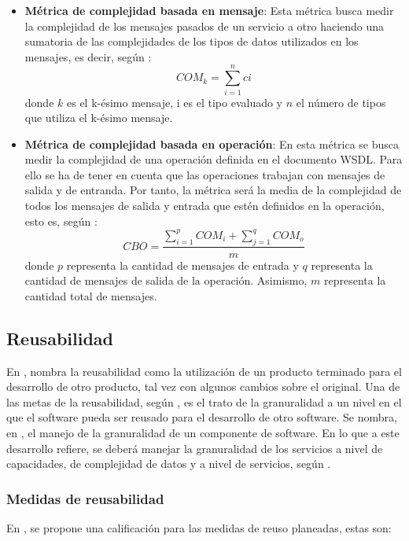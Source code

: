 \begin{itemize}

 \item \textbf{Métrica de complejidad basada en mensaje}: Esta métrica busca medir la complejidad de los mensajes pasados de un servicio a otro haciendo una sumatoria de las complejidades de los tipos de datos utilizados en los mensajes, es decir, según \cite{complexity_mesure}: $$COM_{k} = \sum_{i=1}^{n} ci$$ donde $k$ es el k-ésimo mensaje, i es el tipo evaluado y $n$ el número de tipos que utiliza el k-ésimo mensaje.
 \item \textbf{Métrica de complejidad basada en operación}: En esta métrica se busca medir la complejidad de una operación definida en el documento WSDL. Para ello se ha de tener en cuenta que las operaciones trabajan con mensajes de salida y de entranda. Por tanto, la métrica será la media de la complejidad de todos los mensajes de salida y entrada que estén definidos en la operación, esto es, según \cite{complexity_mesure}: $$CBO = \frac{\sum_{i=1}^{p} COM_{i} + \sum_{j=1}^{q} COM_{o}}{m}$$ donde $p$ representa la cantidad de mensajes de entrada y $q$ representa la cantidad de mensajes de salida de la operación. Asimismo, $m$ representa la cantidad total de mensajes.

\end{itemize}

\subsection{Reusabilidad}

En \cite{computer_science}, nombra la reusabilidad como la utilización de un producto terminado para el desarrollo de otro producto, tal vez con algunos cambios sobre el original. Una de las metas de la reusabilidad, según \cite{computer_science}, es el trato de la granuralidad a un nivel en el que el software pueda ser reusado para el desarrollo de otro software. Se nombra, en \cite{computer_science}, el manejo de la granuralidad de un componente de software. En lo que a este desarrollo refiere, se deberá manejar la granuralidad de los servicios a nivel de capacidades, de complejidad de datos y a nivel de servicios, según \cite{soa_principles}.

\subsubsection{Medidas de reusabilidad}

 En \cite{soa_principles}, se propone una calificación para las medidas de reuso planeadas, estas son:

